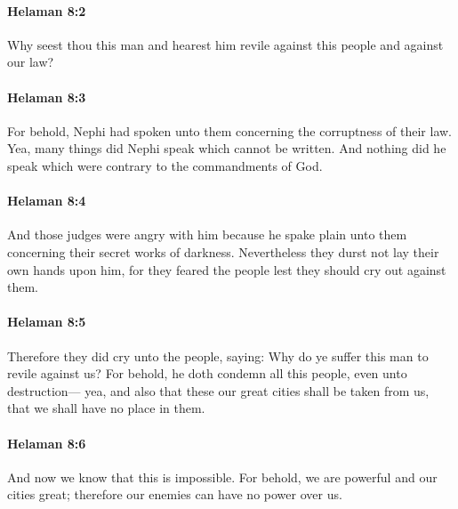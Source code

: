 		\paragraph{Helaman 8:2} %
			\label{HELAMAN-8-2}

			Why seest thou this man and hearest him
			revile against this people and against our law?

		\paragraph{Helaman 8:3} %
			\label{HELAMAN-8-3}

			For behold, Nephi had spoken unto them
			concerning the corruptness of their law.
			Yea, many things did Nephi speak which cannot be written.
			And nothing did he speak which were contrary to the commandments of God.

		\paragraph{Helaman 8:4} %
			\label{HELAMAN-8-4}

			And those judges were angry with him
			because he spake plain unto them concerning their secret works of darkness.
			Nevertheless they durst not lay their own hands upon him,
			for they feared the people lest they should cry out against them.

		\paragraph{Helaman 8:5} %
			\label{HELAMAN-8-5}

			Therefore they did cry unto the people, saying:
			Why do ye suffer this man to revile against us?
			For behold, he doth condemn all this people, even unto destruction---
			yea, and also that these our great cities shall be taken from us,
			that we shall have no place in them.

		\paragraph{Helaman 8:6} %
			\label{HELAMAN-8-6}

			And now we know that this is impossible.
			For behold, we are powerful and our cities great;
			therefore our enemies can have no power over us.

